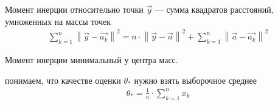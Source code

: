 \begin{example}
{        Момент инерции относительно точки $\vec{y}$ --- сумма квадратов
        расстояний, умноженных на массы точек
        \begin{align*}
            \sum_{k=1}^{n} \left\| \vec{y} - \vec{a_k} \right\|^2
            = n \cdot \left\| \vec{y} - \vec{a} \right\|^2
                + \sum_{k=1}^{n} \left\| \vec{a} - \vec{a_k} \right\|^2
        \end{align*}

        Момент инерции минимальный у центра масс.}
    понимаем, что качестве оценки $\theta_*$ нужно взять выборочное среднее
    \begin{align*}
        \theta_* = \frac{1}{n} \cdot \sum_{k=1}^{n} x_k
    \end{align*}
\end{example}

